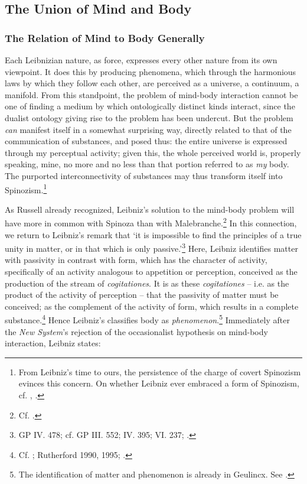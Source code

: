 \documentclass{article}
\begin{document}
\subsection{The Union of Mind and
Body}

\subsubsection{The Relation of Mind to Body
Generally}
Each Leibnizian nature, as force, expresses every other nature from its
own viewpoint. It does this by producing phenomena, which through the
harmonious laws by which they follow each other, are perceived as a
universe, a continuum, a manifold. From this standpoint, the problem of
mind-body interaction cannot be one of finding a medium by which
ontologically distinct kinds interact, since the dualist ontology giving
rise to the problem has been undercut. But the problem \emph{can}
manifest itself in a somewhat surprising way, directly related to that
of the communication of substances, and posed thus: the entire universe
is expressed through my perceptual activity; given this, the whole
perceived world is, properly speaking, mine, no more and no less than
that portion referred to as \emph{my} body. The purported
interconnectivity of substances may thus transform itself into
Spinozism.\footnote{From Leibniz's time to ours, the persistence of the
  charge of covert Spinozism evinces this concern. On whether Leibniz
  ever embraced a form of Spinozism, cf. \autocite{Mercer1999}, \autocite{Kulstad2002}.}

As Russell already recognized, Leibniz's solution to the mind-body
problem will have more in common with Spinoza than with
Malebranche.\footnote{Cf. \autocite[139]{Russell1951}.} In this connection, we
return to Leibniz's remark that `it is impossible to find the principles
of a true unity in matter, or in that which is only passive.'\footnote{GP
  IV. 478; cf. GP III. 552; IV. 395; VI. 237; \autocite[30-31]{Howard2017}.}
Here, Leibniz identifies matter with passivity in contrast with form,
which has the character of activity, specifically of an activity
analogous to appetition or perception, conceived as the production of
the stream of \emph{cogitationes}. It is as these \emph{cogitationes} --
i.e. as the product of the activity of perception -- that the passivity
of matter must be conceived; as the complement of the activity of form,
which results in a complete substance.\footnote{Cf. \autocite{Furth1967};
  Rutherford 1990, 1995; \autocite{Adams1994}.} Hence Leibniz's classifies body as
\emph{phenomenon}.\footnote{The identification of matter and phenomenon
  is already in Geulincx. See \autocite[179]{Cooney1978}.} Immediately after the
\emph{New System}'s rejection of the occasionalist hypothesis on
mind-body interaction, Leibniz states:
\end{document}
